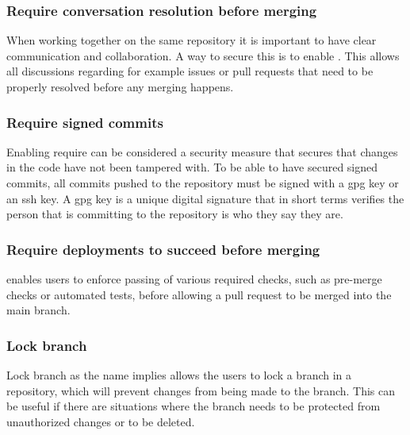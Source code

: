 \subsubsection{Require conversation resolution before merging}
When working together on the same repository it is important to have clear communication and collaboration. A way to secure this is to enable . This allows all discussions regarding for example issues or pull requests that need to be properly resolved before any merging happens. 

\subsubsection{Require signed commits}
Enabling require  can be considered a security measure that secures that changes in the code have not been tampered with. 
To be able to have secured signed commits, all commits pushed to the repository must be signed with a \acrlong{gpg} key or an \acrshort{ssh} key. A \acrshort{gpg} key is a unique digital signature that in short terms verifies the person that is committing to the repository is who they say they are. 


\subsubsection{Require deployments to succeed before merging}
 enables users to enforce passing of various required checks, such as pre-merge checks or automated tests, before allowing a pull request to be merged into the main branch.

\subsubsection{Lock branch}
Lock branch as the name implies allows the users to lock a branch in a repository, which will prevent changes from being made to the branch. This can be useful if there are situations where the branch needs to be protected from unauthorized changes or to be deleted. 

